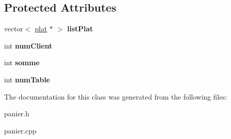 \subsection*{Protected Attributes}
\begin{DoxyCompactItemize}
\item 
vector$<$ \hyperlink{classplat}{plat} $\ast$ $>$ {\bfseries list\+Plat}\hypertarget{classpanier_ad59ee07eb95540ab91ae06ac9738a831}{}\label{classpanier_ad59ee07eb95540ab91ae06ac9738a831}

\item 
int {\bfseries num\+Client}\hypertarget{classpanier_a791c7c33b74a67d1dd73c5adafaf8732}{}\label{classpanier_a791c7c33b74a67d1dd73c5adafaf8732}

\item 
int {\bfseries somme}\hypertarget{classpanier_acbe02df332222969cdebddfc573bad6d}{}\label{classpanier_acbe02df332222969cdebddfc573bad6d}

\item 
int {\bfseries num\+Table}\hypertarget{classpanier_a76dd23c4c09e2d1212d131ca255ee085}{}\label{classpanier_a76dd23c4c09e2d1212d131ca255ee085}

\end{DoxyCompactItemize}


The documentation for this class was generated from the following files\+:\begin{DoxyCompactItemize}
\item 
panier.\+h\item 
panier.\+cpp\end{DoxyCompactItemize}
